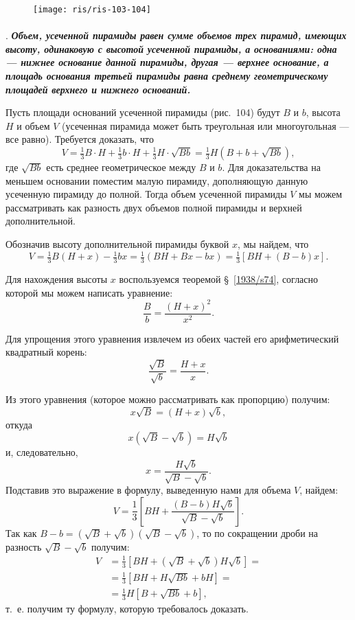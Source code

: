 \documentclass[twoside]{book}
\begin{document}
\begin{figure}[h!]
\centering
\texttt{[image: ris/ris-103-104]}
\caption{}
\end{figure}

\paragraph{}\label{1938/s92}
.
\textbf{\emph{Объем, усеченной пирамиды равен сумме объемов трех пирамид, имеющих высоту, одинаковую с высотой усеченной пирамиды, а основаниями: одна --- нижнее основание данной пирамиды, другая --- верхнее основание, а площадь основания третьей пирамиды равна среднему геометрическому площадей верхнего и нижнего оснований.}}%

Пусть площади оснований усеченной пирамиды (рис.~104) будут $B$ и $b$, высота $H$ и объем $V$ (усеченная пирамида может быть треугольная или многоугольная --- все равно).
Требуется доказать, что
\[V = \tfrac13B\cdot H + \tfrac13 b \cdot H + \tfrac13 H\cdot \sqrt{Bb} = \tfrac13 H(B + b + \sqrt{Bb}),\]
где $\sqrt{Bb}$ есть среднее геометрическое между $B$ и $b$.
Для доказательства на меньшем основании поместим малую пирамиду, дополняющую данную усеченную пирамиду до полной.
Тогда объем усеченной пирамиды $V$ мы можем рассматривать как разность двух объемов полной пирамиды и верхней дополнительной.

Обозначив высоту дополнительной пирамиды буквой $x$, мы найдем, что
\[V = \tfrac13B(H + x)- \tfrac13bx = \tfrac13(BH + Bx-bx) = \tfrac13 [BH + (B - b)x].\]

Для нахождения высоты $x$ воспользуемся теоремой §~\ref{1938/s74}, согласно которой мы можем написать уравнение:
\[\frac Bb=\frac{(H+x)^2}{x^2}.\]

Для упрощения этого уравнения извлечем из обеих частей его арифметический квадратный корень:
\[\frac {\sqrt{B}}{\sqrt{b}}=\frac{H+x}{x}.\]

Из этого уравнения (которое можно рассматривать как пропорцию) получим:
\[x\sqrt{B}=(H+x)\sqrt{b},\]
откуда
\[x(\sqrt{B}-\sqrt{b})=H\sqrt{b}\]
и, следовательно,
\[x=\frac{H\sqrt{b}}{\sqrt{B}-\sqrt{b}}.\]
Подставив это выражение в формулу, выведенную нами для объема $V$, найдем:
\[V=\frac13\left[BH+\frac{(B-b)H\sqrt{b}}{\sqrt{B}-\sqrt{b}}\right].\]
Так как $B - b= (\sqrt{B} + \sqrt{b})(\sqrt{B} - \sqrt{b})$, то по сокращении дроби на разность $\sqrt{B} - \sqrt{b}$ получим:
\begin{align*}
V&=\frac13\left[BH+(\sqrt{B}+\sqrt{b})H\sqrt{b}\right]=
\\
&=\frac13\left[BH+H\sqrt{Bb}+bH\right]=
\\
&=\frac13 H\left[B+\sqrt{Bb}+b\right],
\end{align*}
т.~е. получим ту формулу, которую требовалось доказать.
\end{document}
